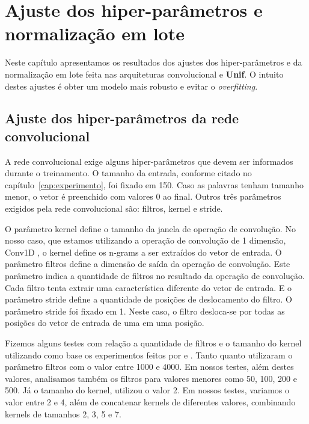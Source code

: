 \chapter{Ajuste dos hiper-parâmetros e normalização em lote}
\label{cap:ajuste-hiper-parametros-cnn}

Neste capítulo apresentamos os resultados dos ajustes dos hiper-parâmetros e da normalização em lote feita nas arquiteturas convolucional e \textbf{Unif}. O intuito destes ajustes é obter um modelo mais robusto e evitar o \textit{overfitting}.

\section{Ajuste dos hiper-parâmetros da rede convolucional}
\label{sec:ajuste-hiper-parametros-cnn}

A rede convolucional exige alguns hiper-parâmetros que devem ser informados durante o treinamento. O tamanho da entrada, conforme citado no capítulo~\ref{cap:experimento}, foi fixado em 150. Caso as palavras tenham tamanho menor, o vetor é preenchido com valores $0$ ao final. Outros três parâmetros exigidos pela rede convolucional são: filtros, kernel e stride.

O parâmetro kernel define o tamanho da janela de operação de convolução. No nosso caso, que estamos utilizando a operação de convolução de 1 dimensão, Conv1D , o kernel define os n-grams a ser extraídos do vetor de entrada. 
O parâmetro filtros define a dimensão de saída da operação de convolução. Este parâmetro indica a quantidade de filtros no resultado da operação de convolução. Cada filtro tenta extrair uma característica diferente do vetor de entrada. E o parâmetro stride define a quantidade de posições de deslocamento do filtro. O parâmetro stride foi fixado em 1. Neste caso, o filtro desloca-se por todas as posições do vetor de entrada de uma em uma posição.

Fizemos alguns testes com relação a quantidade de filtros e o tamanho do kernel utilizando como base os experimentos feitos por \cite{feng-2015} e \cite{tan-lstm-qa}. Tanto \cite{feng-2015} quanto \cite{tan-lstm-qa} utilizaram o parâmetro filtros com o valor entre 1000 e 4000. Em nossos testes, além destes valores, analisamos também os filtros para valores menores como 50, 100, 200 e 500. Já o tamanho do kernel, \cite{tan-lstm-qa} utilizou o valor 2. Em nossos testes, variamos o valor entre 2 e 4, além de concatenar kernels de diferentes valores, combinando kernels de tamanhos 2, 3, 5 e 7.

